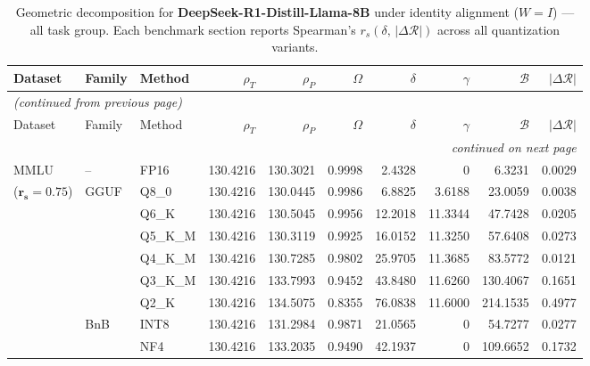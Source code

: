 \begingroup
\small
\setlength{\tabcolsep}{4pt}
\renewcommand{\arraystretch}{1.05}
\setlength{\LTcapwidth}{\textwidth}
\begin{longtable}{ll l rrrrrrr}
\caption{Geometric decomposition for \textbf{DeepSeek-R1-Distill-Llama-8B} under identity alignment ($W{=}I$) --- all task group. Each benchmark section reports Spearman's $r_s(\delta,\,|\Delta\mathcal{R}|)$ across all quantization variants.}\label{tab:deepseek_decomposition_all}\\
\toprule
Dataset & Family & Method & $\rho_T$ & $\rho_P$ & $\Omega$ & $\delta$ & $\gamma$ & $\mathcal{B}$ & $|\Delta\mathcal{R}|$ \\
\midrule
\endfirsthead
\multicolumn{10}{l}{\small\itshape (continued from previous page)}\\
\toprule
Dataset & Family & Method & $\rho_T$ & $\rho_P$ & $\Omega$ & $\delta$ & $\gamma$ & $\mathcal{B}$ & $|\Delta\mathcal{R}|$ \\
\midrule
\endhead
\midrule
\multicolumn{10}{r}{\small\itshape continued on next page}\\
\endfoot
\bottomrule
\endlastfoot
MMLU & -- & FP16 & 130.4216 & 130.3021 & 0.9998 & 2.4328 & \cellcolor{cyan!12} $0$ & 6.3231 & 0.0029 \\
{\small ($\mathbf{r_s{=}0.75}$)} & GGUF & Q8\_0 & 130.4216 & 130.0445 & 0.9986 & 6.8825 & 3.6188 & 23.0059 & 0.0038 \\
 &  & Q6\_K & 130.4216 & 130.5045 & 0.9956 & 12.2018 & 11.3344 & 47.7428 & 0.0205 \\
 &  & Q5\_K\_M & 130.4216 & 130.3119 & 0.9925 & 16.0152 & 11.3250 & 57.6408 & 0.0273 \\
 &  & Q4\_K\_M & 130.4216 & 130.7285 & 0.9802 & 25.9705 & 11.3685 & 83.5772 & 0.0121 \\
 &  & Q3\_K\_M & 130.4216 & 133.7993 & \cellcolor{red!18} 0.9452 & \cellcolor{red!18} 43.8480 & 11.6260 & \cellcolor{red!18} 130.4067 & \cellcolor{red!18} 0.1651 \\
 &  & Q2\_K & 130.4216 & 134.5075 & \cellcolor{red!18} 0.8355 & \cellcolor{red!18} 76.0838 & 11.6000 & \cellcolor{red!18} 214.1535 & \cellcolor{red!18} 0.4977 \\
 & BnB & INT8 & 130.4216 & 131.2984 & 0.9871 & 21.0565 & \cellcolor{cyan!12} $0$ & 54.7277 & 0.0277 \\
 &  & NF4 & 130.4216 & 133.2035 & \cellcolor{red!18} 0.9490 & \cellcolor{red!18} 42.1937 & \cellcolor{cyan!12} $0$ & \cellcolor{red!18} 109.6652 & \cellcolor{red!18} 0.1732 \\

\end{longtable}
